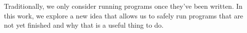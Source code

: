 Traditionally, we only consider running programs once they've been
written. In this work, we explore a new idea that allows us to safely run
programs that are not yet finished and why that is a useful thing to do.

